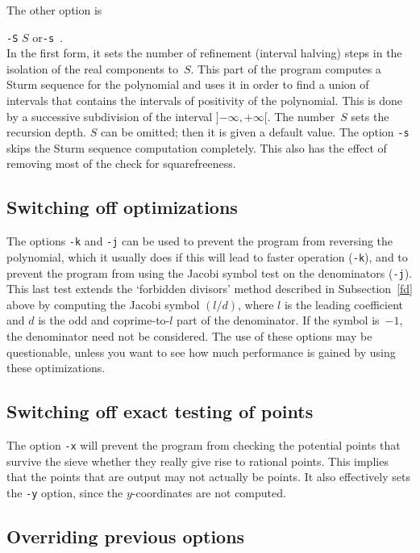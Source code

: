 \documentclass[12pt,a4paper,oneside]{amsart}
\begin{document}
The other option is \\
\strut\quad\verb+-S+ $S$ \quad or\quad \verb+-s+ \,. \\
In the first form, it sets the number of refinement (interval halving)
steps in the isolation of the real components to~$S$. This part of the
program computes a Sturm sequence for the polynomial and uses it in order
to find a union of intervals that contains the intervals of positivity
of the polynomial. This is done by a successive subdivision of the
interval $]{-\infty}, +\infty[$. The number~$S$ sets the recursion depth.
$S$ can be omitted; then it is given a default value. The option
\verb+-s+ skips the Sturm sequence computation completely. This also has
the effect of removing most of the check for squarefreeness.

\subsection{Switching off optimizations}

The options \verb+-k+ and \verb+-j+ can be used to prevent the program
from reversing the polynomial, which it usually does if this will lead
to faster operation (\verb+-k+), and to prevent the program from using
the Jacobi symbol test on the denominators (\verb+-j+). This last test
extends the `forbidden divisors' method described in
Subsection~\ref{fd} above by computing the Jacobi symbol $(l/d)$, where
$l$ is the leading coefficient and $d$ is the odd and coprime-to-$l$
part of the denominator. If the symbol is~$-1$, the denominator need not
be considered. The use of these options may be questionable, unless you
want to see how much performance is gained by using these optimizations.

\subsection{Switching off exact testing of points}

The option \verb+-x+ will prevent the program from checking the potential
points that survive the sieve whether they really give rise to rational
points. This implies that the points that are output may not actually
be points. It also effectively sets the \verb+-y+ option, since the
$y$-coordinates are not computed.

\subsection{Overriding previous options}
\end{document}
